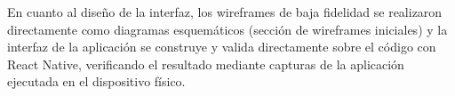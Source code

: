 En cuanto al dise\~no de la interfaz, los wireframes de baja fidelidad se
realizaron directamente como diagramas esquem\'aticos (secci\'on de wireframes
iniciales) y la interfaz de la aplicaci\'on se construye y valida directamente
sobre el c\'odigo con React Native, verificando el resultado mediante capturas
de la aplicaci\'on ejecutada en el dispositivo f\'isico.
